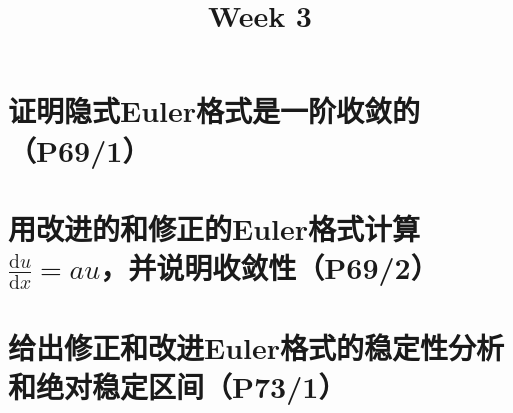 \documentclass{homework}
\title{Week 3}
\date{}
\begin{document}
\maketitle
\section{证明隐式Euler格式是一阶收敛的（P69/1）}

\section{用改进的和修正的Euler格式计算$\frac{\mathrm{d}u}{\mathrm{d}x}=au$，并说明收敛性（P69/2）}

\section{给出修正和改进Euler格式的稳定性分析和绝对稳定区间（P73/1）}
\end{document}
